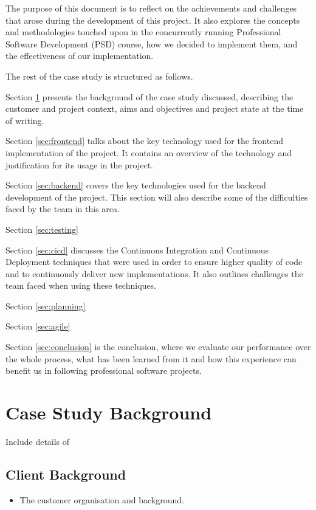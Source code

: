 \documentclass{l3proj}
\begin{document}
The purpose of this document is to reflect on the achievements and challenges
 that arose during the development of this project. It also explores the concepts
 and methodologies touched upon in the concurrently running Professional Software
 Development (PSD) course, how we decided to implement them, and the effectiveness
 of our implementation.

The rest of the case study is structured as follows.

Section \ref{sec:background} presents the background of the case study
 discussed, describing the customer and project context, aims and
 objectives and project state at the time of writing.

Section \ref{sec:frontend} talks about the key technology used for the
 frontend implementation of the project. It contains an overview of the
 technology and justification for its usage in the project.

Section \ref{sec:backend} covers the key technologies used for the 
 backend development of the project. This section will also describe
 some of the difficulties faced by the team in this area.

Section \ref{sec:testing} %

Section \ref{sec:cicd} discusses the Continuous Integration and Continuous
 Deployment techniques that were used in order to ensure higher quality
 of code and to continuously deliver new implementations. It also outlines
 challenges the team faced when using these techniques.

Section \ref{sec:planning} %

Section \ref{sec:agile} %

Section \ref{sec:conclusion} is the conclusion, where we evaluate our
 performance over the whole process, what has been learned from it and
 how this experience can benefit us in following professional software projects.


\section{Case Study Background} %
\label{sec:background}
Include details of

\subsection{Client Background}
\begin{itemize}
\item The customer organisation and background.
\end{itemize}
\end{document}
